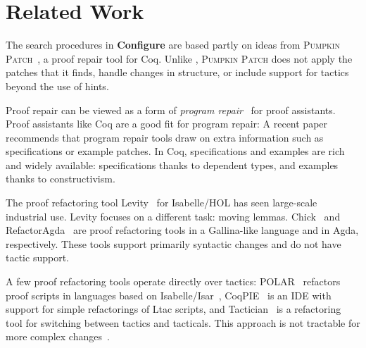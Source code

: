 \section{Related Work}
\label{sec:related}


The search procedures in \textbf{Configure} are based partly on ideas from \textsc{Pumpkin Patch}~\cite{pumpkinpatch}, a proof repair tool for Coq.
Unlike \toolname, \textsc{Pumpkin Patch} does not apply the patches that it finds,
handle changes in structure, or include support for tactics beyond the use of hints.

Proof repair can be viewed as a form of \textit{program repair}~\cite{Monperrus:2018:ASR:3177787.3105906, Gazzola:2018:ASR:3180155.3182526}
for proof assistants.
Proof assistants like Coq are a good fit for program repair: A recent paper~\cite{Qi:2015:APP:2771783.2771791} 
recommends that program repair tools draw on extra information
such as specifications or example patches. In Coq, specifications and examples 
are rich and widely available: specifications thanks to dependent types,
and examples thanks to constructivism.

The proof refactoring tool Levity~\cite{Bourke12} for Isabelle/HOL has seen large-scale industrial use.
Levity focuses on a different task: moving lemmas.
Chick~\cite{robert2018} and RefactorAgda~\cite{wibergh2019} are proof refactoring tools
in a Gallina-like language and in Agda, respectively.
These tools support primarily syntactic changes and do not have tactic support.

A few proof refactoring tools operate directly over tactics:
POLAR~\cite{Dietrich2013} refactors proof scripts in languages based on Isabelle/Isar~\cite{Wenzel2007isar},
CoqPIE~\cite{Roe2016} is an IDE with support for simple refactorings of Ltac scripts, and
Tactician~\cite{adams2015} is a refactoring tool for switching between tactics and tacticals.
This approach is not tractable for more complex changes~\cite{robert2018}.


